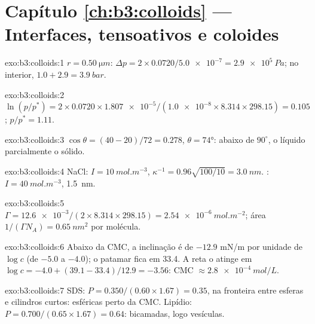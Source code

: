\section*{Capítulo \ref{ch:b3:colloids} --- Interfaces, tensoativos e coloides}

\begin{solution}{exo:b3:colloids:1}
$r = \qty{0.50}{\micro m}$: $\Delta p = 2 \times 0.0720/\num{5.0e-7} = \qty{2.9e5}{Pa}$; no interior, $1.0 + 2.9 = \qty{3.9}{bar}$.
\end{solution}

\begin{solution}{exo:b3:colloids:2}
$\ln(p/p^*) = 2 \times 0.0720 \times \num{1.807e-5}/(\num{1.0e-8} \times 8.314 \times 298.15) = 0.105$; $p/p^* = 1.11$.
\end{solution}

\begin{solution}{exo:b3:colloids:3}
$\cos\theta = (40 - 20)/72 = 0.278$, $\theta = \ang{74}$: abaixo de $90^\circ$, o líquido 
parcialmente o sólido.
\end{solution}

\begin{solution}{exo:b3:colloids:4}
NaCl: $I = \qty{10}{mol.m^{-3}}$, $\kappa^{-1} = 0.96\sqrt{100/10} = \qty{3.0}{nm}$. : $I = \qty{40}{mol.m^{-3}}$, \qty{1.5}{nm}.
\end{solution}

\begin{solution}{exo:b3:colloids:5}
$\Gamma = \num{12.6e-3}/(2 \times 8.314 \times 298.15) = \qty{2.54e-6}{mol.m^{-2}}$; área $1/(\Gamma N_A) =
\qty{0.65}{nm^2}$ por molécula.
\end{solution}

\begin{solution}{exo:b3:colloids:6}
Abaixo da CMC, a inclinação é de $-12.9$ \unit{mN/m} por unidade de $\log c$ (de $-5.0$ a $-4.0$); o
patamar fica em 33.4. A reta o atinge em $\log c = -4.0 + (39.1 - 33.4)/12.9 = -3.56$: CMC
$\approx \qty{2.8e-4}{mol/L}$.
\end{solution}

\begin{solution}{exo:b3:colloids:7}
SDS: $P = 0.350/(0.60 \times 1.67) = 0.35$, na fronteira entre esferas e cilindros curtos:
 esféricas perto da CMC. Lipídio: $P = 0.700/(0.65 \times 1.67) = 0.64$:
bicamadas, logo vesículas.
\end{solution}

